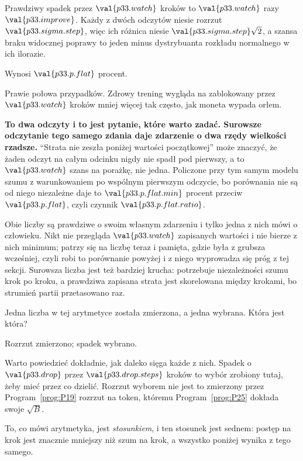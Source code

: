 \begin{fr}
\begin{ansblock}
Prawdziwy spadek przez $\val{p33.watch}$ kroków to $\val{p33.watch}$ razy
$\val{p33.improve}$. Każdy z dwóch odczytów niesie rozrzut
$\val{p33.sigma.step}$, więc ich różnica niesie
$\val{p33.sigma.step}\sqrt{2}$, a szansa braku widocznej poprawy to jeden
minus dystrybuanta rozkładu normalnego w ich ilorazie.

Wynosi $\val{p33.p.flat}$ procent.
\end{ansblock}

Prawie połowa przypadków. Zdrowy trening wygląda na zablokowany przez
$\val{p33.watch}$ kroków mniej więcej tak często, jak moneta wypada orłem.

\begin{note}
\textbf{To dwa odczyty i to jest pytanie, które warto zadać. Surowsze
odczytanie tego samego zdania daje zdarzenie o dwa rzędy wielkości rzadsze.}
\enquote{Strata nie zeszła poniżej wartości początkowej} może znaczyć, że
żaden odczyt na całym odcinku nigdy nie spadł pod pierwszy, a to
$\val{p33.watch}$ szans na porażkę, nie jedna. Policzone przy tym samym
modelu szumu \dash{} z warunkowaniem po wspólnym pierwszym odczycie, bo
porównania nie są od niego niezależne \dash{} daje to
$\val{p33.p.flat.min}$ procent przeciw $\val{p33.p.flat}$, czyli czynnik
$\val{p33.p.flat.ratio}$.

Obie liczby są prawdziwe o swoim własnym zdarzeniu i tylko jedna z nich mówi o
człowieku. Nikt nie przegląda $\val{p33.watch}$ zapisanych wartości i nie
bierze z nich minimum; patrzy się na liczbę teraz i pamięta, gdzie była z
grubsza wcześniej, czyli robi to porównanie powyżej \dash{} i z niego wyprowadza
się próg z tej sekcji. Surowsza liczba jest też bardziej krucha: potrzebuje
niezależności szumu krok po kroku, a prawdziwa zapisana strata jest
skorelowana między krokami, bo strumień partii przetasowano raz.
\end{note}

Jedna liczba w tej arytmetyce została zmierzona, a jedna wybrana. Która jest
która?
\dotline
\nextframe
\end{fr}

\begin{fr}
\begin{ansblock}
Rozrzut zmierzono; spadek wybrano.
\end{ansblock}

Warto powiedzieć dokładnie, jak daleko sięga każde z nich. Spadek o
$\val{p33.drop}$ przez $\val{p33.drop.steps}$ kroków to wybór zrobiony tutaj,
żeby mieć przez co dzielić. Rozrzut wyborem nie jest \dash{} to zmierzony przez
Program~\ref{prog:P19} rozrzut na token, któremu Program~\ref{prog:P25}
dokłada swoje $\sqrt{B}$.

To, co mówi arytmetyka, jest \emph{stosunkiem}, i ten stosunek jest sednem:
postęp na krok jest znacznie mniejszy niż szum na krok, a wszystko poniżej
wynika z tego samego.
\end{fr}

